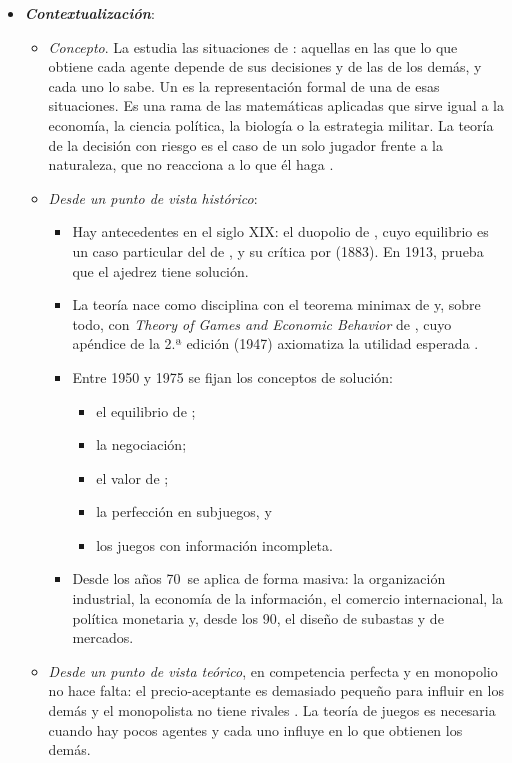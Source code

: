 \documentclass[11pt]{article}
\begin{document}
\begin{itemize}
\item \textbf{\emph{Contextualización}}:
  \begin{itemize}
  \item \emph{Concepto}. La  estudia las situaciones de : aquellas en las que lo que obtiene cada agente depende de sus decisiones y de las de los demás, y cada uno lo sabe. Un  es la representación formal de una de esas situaciones. Es una rama de las matemáticas aplicadas que sirve igual a la economía, la ciencia política, la biología o la estrategia militar. La teoría de la decisión con riesgo es el caso de un solo jugador frente a la naturaleza, que no reacciona a lo que él haga .
  \item \emph{Desde un punto de vista histórico}:
    \begin{itemize}
    \item Hay antecedentes en el siglo XIX: el duopolio de \textcite{Cournot1838Recherches}, cuyo equilibrio es un caso particular del de , y su crítica por  (1883). En 1913,  prueba que el ajedrez tiene solución\nocite{Zermelo1913Anwendung}.
    \item La teoría nace como disciplina con el teorema minimax de \textcite{VonNeumann1928Theorie} y, sobre todo, con \emph{Theory of Games and Economic Behavior} de \textcite{VonNeumannMorgenstern1944Theory}, cuyo apéndice de la 2.ª edición (1947) axiomatiza la utilidad esperada .
    \item Entre 1950 y 1975 se fijan los conceptos de solución:
      \begin{itemize}
      \item el equilibrio de \textcite{Nash1950Equilibrium};
      \item la negociación\nocite{Nash1950Bargaining};
      \item el valor de \textcite{Shapley1953Value};
      \item la perfección en subjuegos\nocite{Selten1965Spieltheoretische}, y
      \item los juegos con información incompleta\nocite{Harsanyi1967Games}.
      \end{itemize}
    \item Desde los años 70~se aplica de forma masiva: la organización industrial, la economía de la información, el comercio internacional, la política monetaria y, desde los 90, el diseño de subastas y de mercados.
    \end{itemize}
  \item \emph{Desde un punto de vista teórico}, en competencia perfecta y en monopolio no hace falta: el precio-aceptante es demasiado pequeño para influir en los demás y el monopolista no tiene rivales  . La teoría de juegos es necesaria cuando hay pocos agentes y cada uno influye en lo que obtienen los demás.
  \end{itemize}


\end{itemize}
\end{document}
